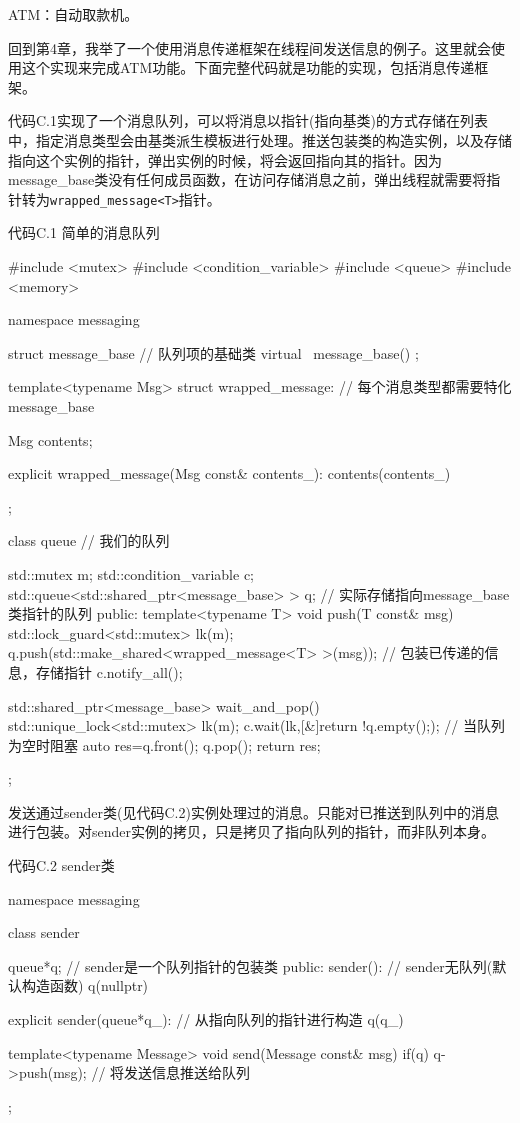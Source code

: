 
ATM：自动取款机。

回到第4章，我举了一个使用消息传递框架在线程间发送信息的例子。这里就会使用这个实现来完成ATM功能。下面完整代码就是功能的实现，包括消息传递框架。

代码C.1实现了一个消息队列，可以将消息以指针(指向基类)的方式存储在列表中，指定消息类型会由基类派生模板进行处理。推送包装类的构造实例，以及存储指向这个实例的指针，弹出实例的时候，将会返回指向其的指针。因为message\_base类没有任何成员函数，在访问存储消息之前，弹出线程就需要将指针转为\texttt{wrapped\_message<T>}指针。

代码C.1 简单的消息队列

\begin{cpp}
#include <mutex>
#include <condition_variable>
#include <queue>
#include <memory>

namespace messaging
{
  struct message_base  // 队列项的基础类
  {
    virtual ~message_base()
    {}
  };

  template<typename Msg>
  struct wrapped_message:  // 每个消息类型都需要特化
    message_base
  {
    Msg contents;

    explicit wrapped_message(Msg const& contents_):
      contents(contents_)
    {}
  };

  class queue  // 我们的队列
  {
    std::mutex m;
    std::condition_variable c;
    std::queue<std::shared_ptr<message_base> > q;  // 实际存储指向message_base类指针的队列
  public:
    template<typename T>
    void push(T const& msg)
    {
      std::lock_guard<std::mutex> lk(m);
      q.push(std::make_shared<wrapped_message<T> >(msg));  // 包装已传递的信息，存储指针
      c.notify_all();
    }

    std::shared_ptr<message_base> wait_and_pop()
    {
      std::unique_lock<std::mutex> lk(m);
      c.wait(lk,[&]{return !q.empty();});  // 当队列为空时阻塞
      auto res=q.front();
      q.pop();
      return res;
    }
  };
}
\end{cpp}

发送通过sender类(见代码C.2)实例处理过的消息。只能对已推送到队列中的消息进行包装。对sender实例的拷贝，只是拷贝了指向队列的指针，而非队列本身。

代码C.2 sender类

\begin{cpp}
namespace messaging
{
  class sender
  {
    queue*q;  // sender是一个队列指针的包装类
  public:
    sender():  // sender无队列(默认构造函数)
      q(nullptr)
    {}

    explicit sender(queue*q_):  // 从指向队列的指针进行构造
      q(q_)
    {}

    template<typename Message>
    void send(Message const& msg)
    {
      if(q)
      {
        q->push(msg);  // 将发送信息推送给队列
      }
    }
  };
}
\end{cpp}

